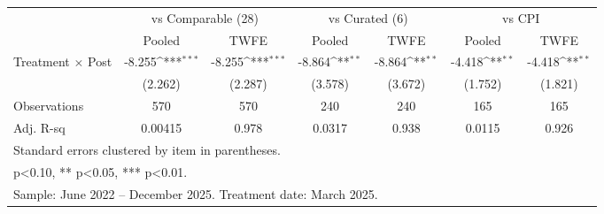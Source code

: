 {
\def\sym#1{\ifmmode^{#1}\else\(^{#1}\)\fi}
\begin{tabular}{l*{6}{c}}
\toprule
                    &\multicolumn{2}{c}{vs Comparable (28)}     &\multicolumn{2}{c}{vs Curated (6)}         &\multicolumn{2}{c}{vs CPI}                 \\\cmidrule(lr){2-3}\cmidrule(lr){4-5}\cmidrule(lr){6-7}
                    &\multicolumn{1}{c}{Pooled}&\multicolumn{1}{c}{TWFE}&\multicolumn{1}{c}{Pooled}&\multicolumn{1}{c}{TWFE}&\multicolumn{1}{c}{Pooled}&\multicolumn{1}{c}{TWFE}\\
\midrule
Treatment $\times$ Post&      -8.255\sym{***}&      -8.255\sym{***}&      -8.864\sym{**} &      -8.864\sym{**} &      -4.418\sym{**} &      -4.418\sym{**} \\
                    &     (2.262)         &     (2.287)         &     (3.578)         &     (3.672)         &     (1.752)         &     (1.821)         \\
\midrule
Observations        &         570         &         570         &         240         &         240         &         165         &         165         \\
Adj. R-sq           &     0.00415         &       0.978         &      0.0317         &       0.938         &      0.0115         &       0.926         \\
\bottomrule
\multicolumn{7}{l}{\footnotesize Standard errors clustered by item in parentheses.}\\
\multicolumn{7}{l}{\footnotesize * p<0.10, ** p<0.05, *** p<0.01.}\\
\multicolumn{7}{l}{\footnotesize Sample: June 2022 -- December 2025. Treatment date: March 2025.}\\
\end{tabular}
}
